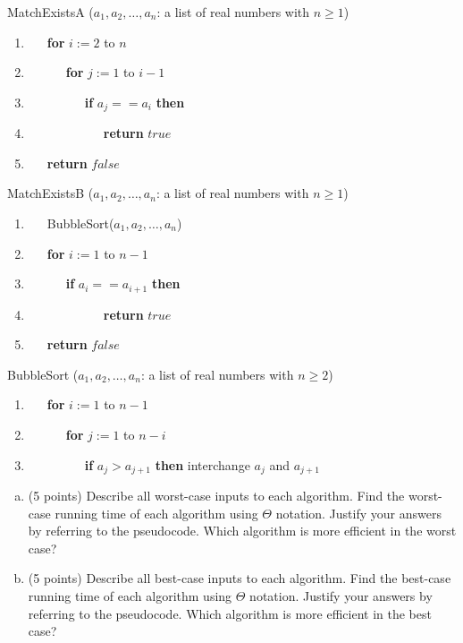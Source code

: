 \documentclass[11pt,letterpaper,unboxed,cm]{hmcpset}
\begin{document}
\begin{enumerate}
\bigskip

 MatchExistsA ($a_1, a_2, \dots, a_n$: a list of real numbers with $n\geq 1$)
\begin{enumerate}[1.]
\item ~~~{\bf for} $i:=2$ to $n$
\item ~~~~~~{\bf for} $j:=1$ to $i-1$
\item ~~~~~~~~~{\bf if} $a_j == a_i$ {\bf then}
\item ~~~~~~~~~~~~{\bf return} $true$
\item ~~~{\bf return} $false$
\end{enumerate}

\bigskip

 MatchExistsB ($a_1, a_2, \dots, a_n$: a list of real numbers with $n\geq 1$)
\begin{enumerate}[1.]
\item ~~~BubbleSort($a_1, a_2, \dots, a_n$)
\item ~~~{\bf for} $i:=1$ to $n-1$
\item ~~~~~~{\bf if} $a_i == a_{i+1}$ {\bf then}
\item ~~~~~~~~~~~~{\bf return} $true$
\item ~~~{\bf return} $false$
\end{enumerate}


\bigskip


 BubbleSort ($a_1, a_2, \dots, a_n$: a list of real numbers with $n\geq 2$)
\begin{enumerate}[1.]
\item ~~~{\bf for} $i := 1$ to $n-1$
\item ~~~~~~{\bf for} $j := 1$ to $n-i$
\item ~~~~~~~~~{\bf if} $a_j>a_{j+1}$ {\bf then} interchange $a_j$ and $a_{j+1}$
\end{enumerate}

\bigskip

\begin{enumerate}[(a)]
\item (5 points) Describe all worst-case inputs to each algorithm. Find the worst-case running time of each algorithm using $\Theta$ notation. Justify your answers by referring to the pseudocode. Which algorithm is more efficient in the worst case?



\item  (5 points) Describe all best-case inputs to each algorithm. Find the best-case running time of each algorithm using $\Theta$ notation. Justify your answers by referring to the pseudocode. Which algorithm is more efficient in the best case?


\end{enumerate}











\end{enumerate}
\end{document}
